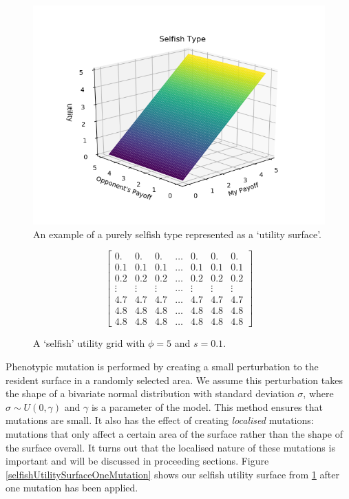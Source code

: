 \documentclass[11pt]{book}
\newcommand*{\np}{\par\noindent\newline}
\begin{document}
\begin{figure}
	\centering
	\includegraphics[scale=0.75]{resources/selfish.png}
	\caption{An example of a purely selfish type represented as a `utility surface'.}
	\label{selfishUtilitySurface}
\end{figure}

\begin{figure}
\[
	\begin{bmatrix} 
	0. & 0. & 0. & \dots & 0. & 0. & 0.\\
	0.1 & 0.1 & 0.1 & \dots & 0.1 & 0.1 & 0.1\\
	0.2 & 0.2 & 0.2 & \dots & 0.2 & 0.2 & 0.2\\
	\vdots & \vdots & \vdots & \dots & \vdots &\vdots &\vdots\\
	4.7 & 4.7 & 4.7 & \dots & 4.7 & 4.7 & 4.7\\
	4.8 & 4.8 & 4.8 & \dots & 4.8 & 4.8 & 4.8\\
	4.8 & 4.8 & 4.8 & \dots & 4.8 & 4.8 & 4.8 
	\end{bmatrix}
\]
\caption{A `selfish' utility grid with $\phi = 5$ and $s = 0.1$.}
\label{selfishUtilityGrid}
\end{figure}

\np Phenotypic mutation is performed by creating a small perturbation to the resident surface in a randomly selected area.
We assume this perturbation takes the shape of a bivariate normal distribution with standard deviation $\sigma$, where $\sigma \sim U(0,\gamma)$ and $\gamma$ is a parameter of the model.
This method ensures that mutations are small.
It also has the effect of creating \textit{localised} mutations: mutations that only affect a certain area of the surface rather than the shape of the surface overall.
It turns out that the localised nature of these mutations is important and will be discussed in proceeding sections.
Figure \ref{selfishUtilitySurfaceOneMutation} shows our selfish utility surface from \ref{selfishUtilitySurface} after one mutation has been applied.
\end{document}
